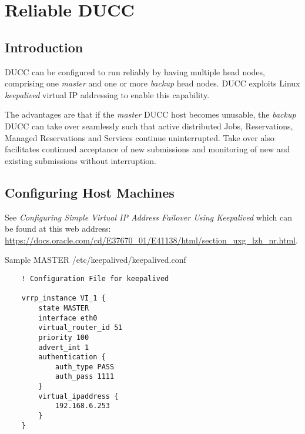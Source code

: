% 
% 
% 
% 
\ifpdf
\else
{}
\fi
\chapter{Reliable DUCC}
\label{chap:reliable}

\section{Introduction}
    DUCC can be configured to run reliably by having multiple head nodes,
    comprising one {\em master} and one or more {\em backup} head nodes.
    DUCC exploits Linux {\em keepalived} virtual IP addressing to enable
    this capability.
    
    The advantages are that if the {\em master} DUCC host becomes
    unusable, the {\em backup} DUCC can take over seamlessly
    such that active distributed Jobs, Reservations, Managed Reservations 
    and Services continue uninterrupted.  Take over also facilitates
    continued acceptance of new submissions and monitoring of new and
    existing submissions without interruption.
        
\section{Configuring Host Machines}    
    See {\em Configuring Simple Virtual IP Address Failover Using Keepalived} 
    which can be found at this web address: 
    \url{https://docs.oracle.com/cd/E37670_01/E41138/html/section_uxg_lzh_nr.html}.

	Sample MASTER /etc/keepalived/keepalived.conf
	
	\begin{verbatim}
    ! Configuration File for keepalived

	vrrp_instance VI_1 {
	    state MASTER
	    interface eth0
	    virtual_router_id 51
	    priority 100
	    advert_int 1
	    authentication {
	        auth_type PASS
	        auth_pass 1111
	    }
	    virtual_ipaddress {
	        192.168.6.253
	    }
	}
   	\end{verbatim}

